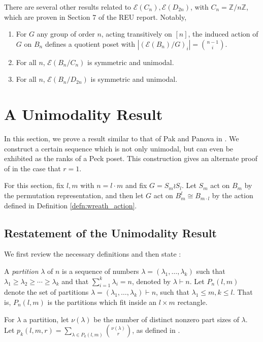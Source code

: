 \documentclass[smallextended, envcountsame, numbook]{svjour3}
\numberwithin{equation}{section}
\newcommand\ssec{\subsection}
\begin{document}
\begin{remark}
There are several other results related to $\mathcal E(C_n),\mathcal E(D_{2n})$, with $C_n = \mathbb Z/n\mathbb Z$, which are proven in Section 7 of the REU report. Notably,
\begin{enumerate}
	\item For $G$ any group of order $n$, acting transitively on $[n]$, the induced action of $G$ on $B_n$ defines a quotient poset with $|(\mathcal E(B_n)/G)_i| = \binom {n-1} i$.
	\item For all $n$, $\mathcal E(B_n/C_n)$ is symmetric and unimodal.
	\item For all $n$, $\mathcal E(B_n/D_{2n})$ is symmetric and unimodal.
\end{enumerate}
\end{remark}



\section{A Unimodality Result}\label{sec:wreath_product}

In this section, we prove a result similar to that of Pak and Panova in \cite[Theorem 1.1]{pak}. We construct a certain sequence which is not only unimodal, but can even be exhibited as the ranks of a Peck poset. This construction gives an alternate proof of \cite[Theorem 1.1]{pak} in the case that $r = 1$.


For this section, fix $l,m$ with $n = l \cdot m$ and fix $G = S_m \wr S_l$. Let $S_m$ act on $B_m$ by the permutation representation, and then let $G$ act on $B_{m}^l\cong B_{m \cdot l}$ by the action defined in Definition \ref{defn:wreath_action}.

\ssec{Restatement of the Unimodality Result}
We first review the necessary definitions and then state \cite[Theorem 1.1]{pak}:

A {\it partition} $\lambda$ of $n$ is a sequence of numbers $\lambda = (\lambda_1,\ldots, \lambda_k)$ such that $\lambda_1 \geq \lambda_2 \geq \cdots \geq \lambda_k$ and that $\sum_{i=1}^k \lambda_i = n$, denoted by  $\lambda \vdash n$. Let $P_n(l,m)$ denote the set of partitions $\lambda = (\lambda_1,\ldots, \lambda_k) \vdash n$, such that $\lambda_1 \leq m,k \leq l$. That is, $P_n(l,m)$ is the partitions which fit inside an $l \times m$ rectangle.

For $\lambda$ a partition, let $\nu(\lambda)$ be the number of distinct nonzero part sizes of $\lambda$.  Let $p_k(l,m,r) = \sum_{\lambda \in P_k(l,m)} \binom{\nu(\lambda)}{r}$, as defined in \cite[Section 1]{pak}.
\end{document}
